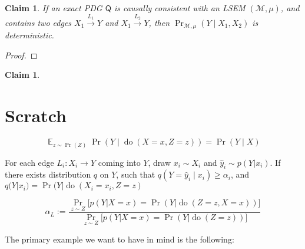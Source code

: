 \documentclass{article}
\newcommand{\E}{\mathop{\mathbb E}}
\newcommand{\dg}[1]{\mathsf #1}
\theoremstyle{plain}
\newtheorem{claim}[theorem]{Claim}
\theoremstyle{definition}
\theoremstyle{remark}
\newcommand{\cdo}{\mathop{\mathrm{do}}}
\newcommand{\evt}[2]{#1\!\!=\!#2}
\begin{document}
\begin{claim}
	If an exact PDG $\dg Q$ is causally consistent with an LSEM $(\mathcal M, \mu)$, and contains two edges $X_1 \overset{L_1}\longrightarrow Y$ and $X_1 \overset{L_2}\longrightarrow Y$, then $\Pr_{\mathcal M, \mu}(Y \mid X_1, X_2)$ is deterministic.
\end{claim}
\begin{proof}
	
\end{proof}


\begin{claim}
	
\end{claim}




\section*{Scratch}

	\[ \E_{z \sim \Pr(Z)}\Pr(Y \mid \cdo(X=x,Z=z)) = \Pr(Y \mid X) \]


%
%


For each edge $L_i : X_i \to Y$ coming into $Y$, draw $x_i \sim X_i$ and $\hat y_i \sim p(Y|x_i)$. 
If there exists distribution $q$ on $Y$, such that $q(Y=\hat y_i \mid x_i) \geq \alpha_i$, and $q(Y | x_i) = \Pr(Y | \cdo(\evt{X_i}{x_i}, \evt Zz) $


\[  \alpha_L :=  \frac{\Pr_{ z \sim Z} \Big[ p( Y | X=x) = \Pr(Y | \cdo(Z\!=\!z,X\!=\!x)) \Big]}{\Pr_{ z \sim Z} \Big[ p( Y | X=x) = \Pr(Y | \cdo(Z\!=\!z)) \Big]} \] 


The primary example we want to have in mind is the following:


\end{document}
